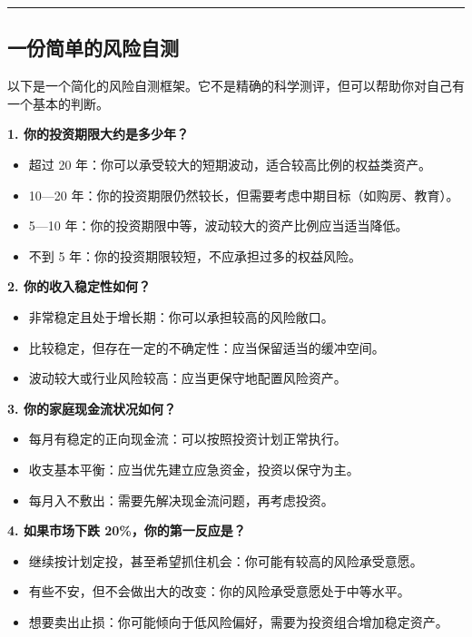 \documentclass[a4paper,11pt,oneside,fontset=none,UTF8,zihao=-4]{ctexbook}
\providecommand{\tightlist}{\setlength{\itemsep}{2pt}\setlength{\parskip}{1pt}}
\begin{document}
\begin{center}{\color{dh-bronze}\rule{0.2\textwidth}{0.5pt}}\end{center}

\subsection{一份简单的风险自测}\label{ux4e00ux4efdux7b80ux5355ux7684ux98ceux9669ux81eaux6d4b}

以下是一个简化的风险自测框架。它不是精确的科学测评，但可以帮助你对自己有一个基本的判断。

\textbf{1. 你的投资期限大约是多少年？}

\begin{itemize}
\tightlist
\item
  超过 20 年：你可以承受较大的短期波动，适合较高比例的权益类资产。
\item
  10---20 年：你的投资期限仍然较长，但需要考虑中期目标（如购房、教育）。
\item
  5---10 年：你的投资期限中等，波动较大的资产比例应当适当降低。
\item
  不到 5 年：你的投资期限较短，不应承担过多的权益风险。
\end{itemize}

\textbf{2. 你的收入稳定性如何？}

\begin{itemize}
\tightlist
\item
  非常稳定且处于增长期：你可以承担较高的风险敞口。
\item
  比较稳定，但存在一定的不确定性：应当保留适当的缓冲空间。
\item
  波动较大或行业风险较高：应当更保守地配置风险资产。
\end{itemize}

\textbf{3. 你的家庭现金流状况如何？}

\begin{itemize}
\tightlist
\item
  每月有稳定的正向现金流：可以按照投资计划正常执行。
\item
  收支基本平衡：应当优先建立应急资金，投资以保守为主。
\item
  每月入不敷出：需要先解决现金流问题，再考虑投资。
\end{itemize}

\textbf{4. 如果市场下跌 20\%，你的第一反应是？}

\begin{itemize}
\tightlist
\item
  继续按计划定投，甚至希望抓住机会：你可能有较高的风险承受意愿。
\item
  有些不安，但不会做出大的改变：你的风险承受意愿处于中等水平。
\item
  想要卖出止损：你可能倾向于低风险偏好，需要为投资组合增加稳定资产。
\end{itemize}
\end{document}
